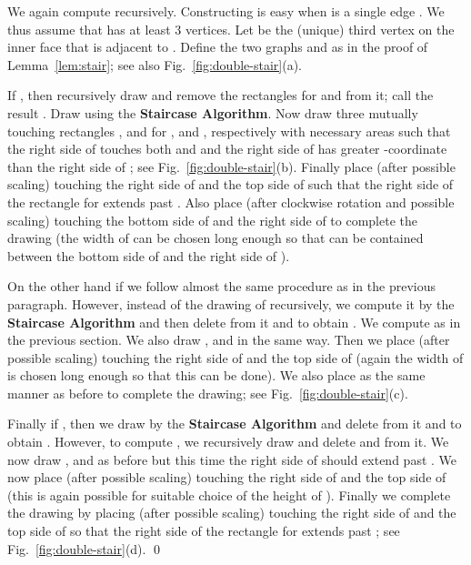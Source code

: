 \documentclass{llncs}
\renewenvironment{proof}{\medskip\noindent{\bf Proof:}}{\mbox{}\hfill\qed\par}
\begin{document}
\begin{proof}
We again compute  recursively. Constructing  is easy when  is a single
 edge . We thus assume that  has at least 3 vertices. Let  be the (unique)
 third vertex on the inner face that is adjacent to . Define the two graphs 
 and  as in the proof of Lemma~\ref{lem:stair}; see also Fig.~\ref{fig:double-stair}(a).






If , then recursively draw  and remove the rectangles for  and  from it;
 call the result . Draw  using the \textbf{Staircase Algorithm}. Now draw
 three mutually touching rectangles ,  and  for ,  and , respectively
 with necessary areas such that the right side of  touches both  and  and
 the right side of  has greater -coordinate than the right side of ; see
 Fig.~\ref{fig:double-stair}(b). Finally place  (after possible scaling) touching
 the right side of  and the top side of  such that the right side of the rectangle
 for  extends past . Also place  (after  clockwise rotation
 and possible scaling) touching the bottom side of  and the right side of  to
 complete the drawing (the width of  can be chosen long enough so that 
 can be contained between the bottom side of  and the right side of ).
	



	
 On the other hand if  we follow almost the same procedure as in the previous paragraph.
	However, instead of the drawing of  recursively, we compute it by the \textbf{Staircase
	Algorithm} and then delete from it  and  to obtain . We compute 
	as in the previous section. We also draw ,  and  in the same way. Then we
	place  (after possible scaling) touching the right side of  and the top
	side of  (again the width of  is chosen long enough so that this can be done).
	We also place  as the same manner as before to complete the drawing; see
	Fig.~\ref{fig:double-stair}(c).
	
	
	Finally if , then we draw  by the \textbf{Staircase Algorithm} and delete
	from it  and  to obtain . However, to compute , we recursively
	draw  and delete  and  from it. We now draw ,  and  as
	before but this time the right side of  should extend past . We now place
	 (after possible scaling) touching the right side of  and the top side
	of  (this is again possible for suitable choice of the height of ). Finally
	we complete the drawing by placing  (after possible scaling) touching the
	right side of  and the top side of  so that the right side of the rectangle
	for  extends past ; see Fig.~\ref{fig:double-stair}(d).
\end{proof}
\end{document}
